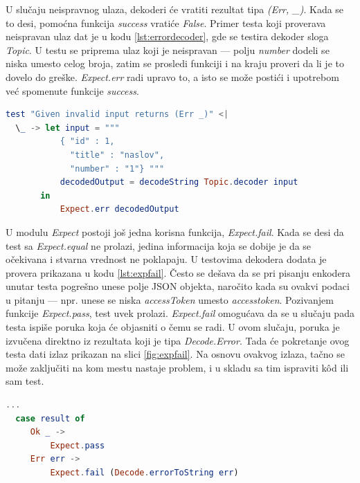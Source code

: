 \documentclass[12pt,oneside]{memoir}
\begin{document}
\par U slučaju neispravnog ulaza, dekoderi će vratiti rezultat tipa \emph{(Err, \_)}. Kada se to desi, pomoćna funkcija \emph{success} vratiće \emph{False}. Primer testa koji proverava neispravan ulaz dat je u kodu \ref{lst:errordecoder}, gde se testira dekoder sloga \emph{Topic}. U testu se priprema ulaz koji je neispravan --- polju \emph{number} dodeli se niska umesto celog broja, zatim se prosledi funkciji i na kraju proveri da li je to dovelo do greške. \emph{Expect.err} radi upravo to, a isto se može postići i upotrebom već spomenute funkcije \emph{success}.

\begin{minipage}{\linewidth}
\begin{lstlisting}[language=elm, basicstyle=\small, caption={Implementacija testa koji izaziva grešku na primeru funkcije \emph{Topic.decoder}},captionpos=b, label={lst:errordecoder}]
test "Given invalid input returns (Err _)" <|
  \_ -> let input = """
           { "id" : 1,
             "title" : "naslov",
             "number" : "1"} """
           decodedOutput = decodeString Topic.decoder input
       in 
           Expect.err decodedOutput
\end{lstlisting}
\end{minipage}

\par U modulu \emph{Expect} postoji još jedna korisna funkcija, \emph{Expect.fail}. Kada se desi da test sa \emph{Expect.equal} ne prolazi, jedina informacija koja se dobije je da se očekivana i stvarna vrednost ne poklapaju. U testovima dekodera dodata je provera prikazana u kodu \ref{lst:expfail}. Često se dešava da se pri pisanju enkodera unutar testa pogrešno unese polje JSON objekta, naročito kada su ovakvi podaci u pitanju --- npr. unese se niska \emph{accessToken} umesto \emph{access{\textunderscore}token}. Pozivanjem funkcije \emph{Expect.pass}, test uvek prolazi. \emph{Expect.fail} omogućava da se u slučaju pada testa ispiše poruka koja će objasniti o čemu se radi. U ovom slučaju, poruka je izvučena direktno iz rezultata koji je tipa \emph{Decode.Error}. Tada će pokretanje ovog testa dati izlaz prikazan na slici \ref{fig:expfail}. Na osnovu ovakvog izlaza, tačno se može zaključiti na kom mestu nastaje problem, i u skladu sa tim ispraviti k\^{o}d ili sam test.

\begin{minipage}{\linewidth}
\begin{lstlisting}[language=elm, basicstyle=\small, caption={Implementacija testa koji izbacuje poruku u slučaju da ne prolazi},captionpos=b, label={lst:expfail}]
...
  case result of 
     Ok _ -> 
         Expect.pass
     Err err -> 
         Expect.fail (Decode.errorToString err)
\end{lstlisting}
\end{minipage}
\end{document}
